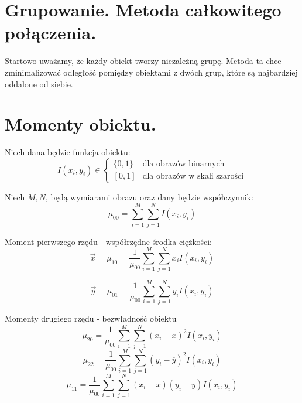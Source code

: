 \documentclass[a4paper,10pt]{article}
\begin{document}
\section{Grupowanie. Metoda całkowitego połączenia.}
Startowo uważamy, że każdy obiekt tworzy niezależną grupę.
Metoda ta chce zminimalizować odległość pomiędzy obiektami z dwóch grup, które są najbardziej oddalone od siebie.

\section{Momenty obiektu.}
Niech dana będzie funkcja obiektu:
\begin{equation}
 I(x_i, y_i) \in 
\begin{cases}
 \{0, 1\} & \mbox{dla obrazów binarnych}\\
 \left[0, 1\right] & \mbox{dla obrazów w skali szarości}
\end{cases}
\end{equation}

Niech $M, N$, będą wymiarami obrazu oraz dany będzie współczynnik:
\begin{equation}
  \mu_{00} = \sum_{i=1}^{M} \sum_{j=1}^{N} I(x_i, y_i)
\end{equation}

Moment pierwszego rzędu - współrzędne środka ciężkości:
\begin{equation}
  \overrightarrow{x} = \mu_{10} = \frac{1}{\mu_{00}} \sum_{i=1}^{M} \sum_{j=1}^{N} x_i I(x_i, y_i)
\end{equation}

\begin{equation}
  \overrightarrow{y} = \mu_{01} = \frac{1}{\mu_{00}} \sum_{i=1}^{M} \sum_{j=1}^{N} y_i I(x_i, y_i)
\end{equation}

Momenty drugiego rzędu - bezwładność obiektu
\begin{equation}
  \mu_{20} = \frac{1}{\mu_{00}} \sum_{i=1}^{M} \sum_{j=1}^{N} (x_i - \overline{x})^2 I(x_i, y_i)
\end{equation}
\begin{equation}
  \mu_{22} = \frac{1}{\mu_{00}} \sum_{i=1}^{M} \sum_{j=1}^{N} (y_i - \overline{y})^2 I(x_i, y_i)
\end{equation}
\begin{equation}
  \mu_{11} = \frac{1}{\mu_{00}} \sum_{i=1}^{M} \sum_{j=1}^{N} (x_i - \overline{x})(y_i - \overline{y}) I(x_i, y_i)
\end{equation}
\end{document}
